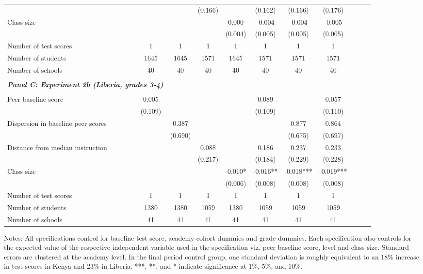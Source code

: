 \begin{center}
\begin{scriptsize}
\begin{threeparttable}
\begin{tabular} {@{} l l c c c c c c c c c c  @{}}
                 &  &  &  & (0.166) &  & (0.162) & (0.166) & (0.176) \\
Class size &  &  &  &  & 0.000 & -0.004 & -0.004 & -0.005 \\
                 &  &  &  &  & (0.004) & (0.005) & (0.005) & (0.005) \\
\midrule
Number of test scores &  & 1 & 1 & 1 & 1 & 1 & 1 & 1 \\
Number of students &  & 1645 & 1645 & 1571 & 1645 & 1571 & 1571 & 1571 \\
Number of schools &  & 40 & 40 & 40 & 40 & 40 & 40 & 40 \\
 \midrule
\\
\multicolumn{3}{l}{\textbf{\textit{Panel C: Experiment 2b (Liberia, grades 3-4)}}} \\
\\
Peer baseline score &  & 0.005 &  &  &  & 0.089 &  & 0.057 \\
                 &  & (0.109) &  &  &  & (0.109) &  & (0.110) \\
Dispersion in baseline peer scores &  &  & 0.387 &  &  &  & 0.877 & 0.864 \\
                 &  &  & (0.690) &  &  &  & (0.675) & (0.697) \\
Distance from median instruction &  &  &  & 0.088 &  & 0.186 & 0.237 & 0.233 \\
                 &  &  &  & (0.217) &  & (0.184) & (0.229) & (0.228) \\
Class size &  &  &  &  & -0.010* & -0.016** & -0.018*** & -0.019*** \\
                 &  &  &  &  & (0.006) & (0.008) & (0.008) & (0.008) \\
\midrule
Number of test scores &  & 1 & 1 & 1 & 1 & 1 & 1 & 1 \\
Number of students &  & 1380 & 1380 & 1059 & 1380 & 1059 & 1059 & 1059 \\
Number of schools &  & 41 & 41 & 41 & 41 & 41 & 41 & 41 \\
\bottomrule
\end{tabular}
\begin{tablenotes}
\item Notes: All specifications control for baseline test score, academy cohort dummies and grade dummies. Each specification also controls for the expected value of the respective independent variable used in the specification viz. peer baseline score, level and class size. Standard errors are clustered at the academy level. In the final period control group, one standard deviation is roughly equivalent to an 18\% increase in test scores in Kenya and 23\% in Liberia. ***, **, and * indicate significance at 1\%, 5\%, and 10\%.\end{tablenotes}
\end{threeparttable}
\end{scriptsize}
\end{center}
\clearpage
